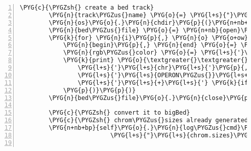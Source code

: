 \begin{Verbatim}[commandchars=\\\{\},numbers=left,firstnumber=1,stepnumber=5]
        \PYG{c}{\PYGZsh{} create a bed track}
        \PYG{n}{track\PYGZus{}name} \PYG{o}{=} \PYG{l+s}{"}\PYG{l+s}{rna-seqlyze-operon\PYGZus{}predictions}\PYG{l+s}{"}
        \PYG{n}{os}\PYG{o}{.}\PYG{n}{chdir}\PYG{p}{(}\PYG{n+nb+bp}{self}\PYG{o}{.}\PYG{n}{analysis}\PYG{o}{.}\PYG{n}{data\PYGZus{}dir}\PYG{p}{)}
        \PYG{n}{bed\PYGZus{}file} \PYG{o}{=} \PYG{n+nb}{open}\PYG{p}{(}\PYG{n}{track\PYGZus{}name} \PYG{o}{+} \PYG{l+s}{"}\PYG{l+s}{.bed}\PYG{l+s}{"}\PYG{p}{,} \PYG{l+s}{"}\PYG{l+s}{w}\PYG{l+s}{"}\PYG{p}{)}
        \PYG{k}{for} \PYG{n}{i}\PYG{p}{,} \PYG{n}{o} \PYG{o+ow}{in} \PYG{n+nb}{enumerate}\PYG{p}{(}\PYG{n+nb+bp}{self}\PYG{o}{.}\PYG{n}{operons}\PYG{p}{)}\PYG{p}{:}
            \PYG{n}{begin}\PYG{p}{,} \PYG{n}{end} \PYG{o}{=} \PYG{n+nb}{str}\PYG{p}{(}\PYG{n}{o}\PYG{o}{.}\PYG{n}{begin}\PYG{p}{)}\PYG{p}{,} \PYG{n+nb}{str}\PYG{p}{(}\PYG{n}{o}\PYG{o}{.}\PYG{n}{end}\PYG{p}{)}
            \PYG{n}{rgb\PYGZus{}color} \PYG{o}{=} \PYG{l+s}{'}\PYG{l+s}{,}\PYG{l+s}{'}\PYG{o}{.}\PYG{n}{join}\PYG{p}{(}\PYG{p}{(}\PYG{n+nb}{str}\PYG{p}{(}\PYG{l+m+mi}{100} \PYG{o}{-} \PYG{n+nb}{int}\PYG{p}{(}\PYG{n}{o}\PYG{o}{.}\PYG{n}{confidence}\PYG{p}{)}\PYG{p}{)}\PYG{p}{,}\PYG{p}{)}\PYG{o}{*}\PYG{l+m+mi}{3}\PYG{p}{)}
            \PYG{k}{print} \PYG{o}{\textgreater{}\textgreater{}} \PYG{n}{bed\PYGZus{}file}\PYG{p}{,} \PYG{l+s}{'}\PYG{l+s+se}{\PYGZbs{}t}\PYG{l+s}{'}\PYG{o}{.}\PYG{n}{join}\PYG{p}{(}\PYG{p}{(}
                \PYG{l+s}{'}\PYG{l+s}{chr}\PYG{l+s}{'}\PYG{p}{,} \PYG{n}{begin}\PYG{p}{,} \PYG{n}{end}\PYG{p}{,}
                \PYG{l+s}{'}\PYG{l+s}{OPERON\PYGZus{}}\PYG{l+s+si}{\PYGZpc{}d}\PYG{l+s}{'} \PYG{o}{\PYGZpc{}} \PYG{n}{i}\PYG{p}{,} \PYG{n+nb}{str}\PYG{p}{(}\PYG{n}{o}\PYG{o}{.}\PYG{n}{confidence}\PYG{p}{)}\PYG{p}{,}
                \PYG{l+s}{'}\PYG{l+s}{+}\PYG{l+s}{'} \PYG{k}{if} \PYG{n}{o}\PYG{o}{.}\PYG{n}{strand} \PYG{o}{\textgreater{}} \PYG{l+m+mi}{0} \PYG{k}{else} \PYG{l+s}{'}\PYG{l+s}{-}\PYG{l+s}{'}\PYG{p}{,} \PYG{n}{begin}\PYG{p}{,} \PYG{n}{end}\PYG{p}{,} \PYG{n}{rgb\PYGZus{}color}
            \PYG{p}{)}\PYG{p}{)}
        \PYG{n}{bed\PYGZus{}file}\PYG{o}{.}\PYG{n}{close}\PYG{p}{(}\PYG{p}{)}

        \PYG{c}{\PYGZsh{} convert it to bigBed}
        \PYG{c}{\PYGZsh{} chrom\PYGZus{}sizes already generated during "transterm\PYGZus{}hp"}
        \PYG{n+nb+bp}{self}\PYG{o}{.}\PYG{n}{log\PYGZus{}cmd}\PYG{p}{(}\PYG{l+s}{"}\PYG{l+s}{bedToBigBed}\PYG{l+s}{"}\PYG{p}{,} \PYG{n}{track\PYGZus{}name} \PYG{o}{+} \PYG{l+s}{"}\PYG{l+s}{.bed}\PYG{l+s}{"}\PYG{p}{,}
                         \PYG{l+s}{"}\PYG{l+s}{chrom.sizes}\PYG{l+s}{"}\PYG{p}{,} \PYG{n}{track\PYGZus{}name} \PYG{o}{+} \PYG{l+s}{"}\PYG{l+s}{.bigbed}\PYG{l+s}{"}\PYG{p}{)}


\end{Verbatim}
